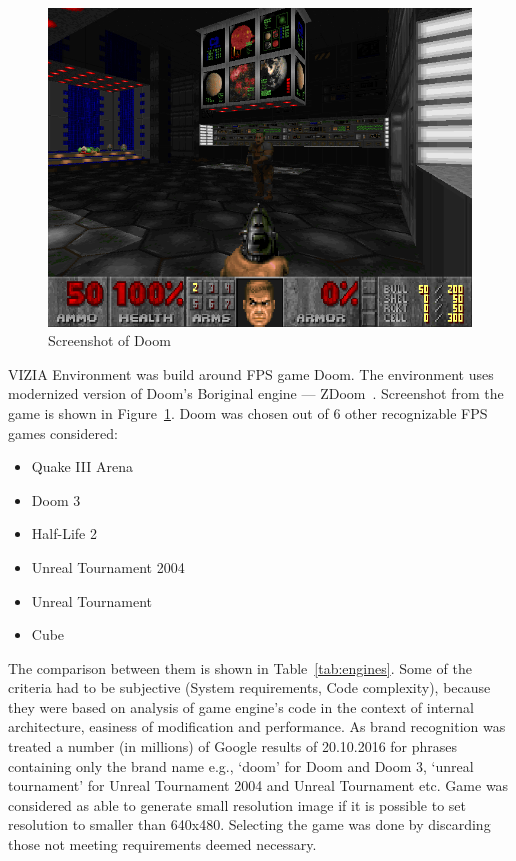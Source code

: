 \documentclass[english,bachelor,a4paper,twoside]{ppfcmthesis}
\begin{document}


\begin{figure}
\centering
\includegraphics[scale=0.5]{doom.png}
\caption{Screenshot of Doom}
\label{fig:doom}
\end{figure}

VIZIA Environment was build around FPS game Doom. 
The environment uses  modernized version of Doom's Boriginal engine --- ZDoom~\cite{zdoom-main}. 
Screenshot from the game is shown in Figure~\ref{fig:doom}.
Doom was chosen out of 6 other recognizable FPS games considered: 

\begin{itemize}
\item Quake III Arena 
\item Doom 3
\item Half-Life 2 
\item Unreal Tournament 2004
\item Unreal Tournament
\item Cube
\end{itemize}
The comparison between them is shown in Table~\ref{tab:engines}.
Some of the criteria had to be subjective (System requirements, Code complexity), because they were based on analysis of game engine's code in the context of internal architecture, easiness of modification and performance. 
As brand recognition was treated a number (in millions) of Google results of 20.10.2016 for phrases containing only the brand name e.g., `doom' for Doom and Doom 3, `unreal tournament' for Unreal Tournament 2004 and Unreal Tournament etc.
Game was considered as able to generate small resolution image if it is possible to set resolution to smaller than 640x480.
Selecting the game was done by discarding those not meeting requirements deemed necessary.
\end{document}

